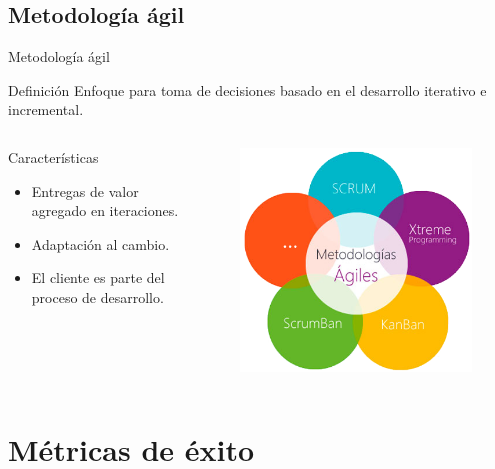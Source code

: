 \documentclass[10pt,xcolor=table ]{beamer}
\begin{document}
\subsection{Metodología ágil}
\begin{frame}{Metodología ágil}
	\begin{alertblock}{Definición}
		Enfoque para toma de decisiones basado en el desarrollo iterativo e incremental.
	\end{alertblock}

	\begin{columns}[c,onlytextwidth]
		\begin{block}{Características}
			\begin{itemize}
	        	\item Entregas de valor agregado en iteraciones.
	        	\item Adaptación al cambio.
	        	\item El cliente es parte del proceso de desarrollo.
	    	\end{itemize}
		\end{block}
		\begin{figure}
		    \includegraphics[scale=0.32]{../Figuras/met_agiles}
		\end{figure}
  	\end{columns}
\end{frame}

\section{Métricas de éxito}
\end{document}
